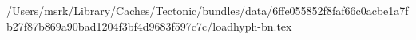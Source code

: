 /Users/msrk/Library/Caches/Tectonic/bundles/data/6ffe055852f8faf66c0acbe1a7fb27f87b869a90bad1204f3bf4d9683f597c7c/loadhyph-bn.tex